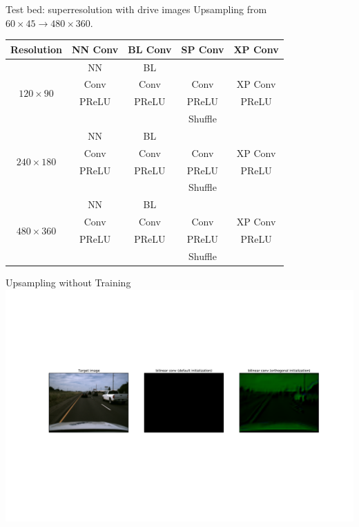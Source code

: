 \documentclass[]{beamer}
\begin{document}
\begin{frame}{Test bed: superresolution with drive images}
\centering
Upsampling from $60 \times 45 \rightarrow 480 \times 360$.
\begin{table}
\begin{tabular}{ccccc}
Resolution                           & NN Conv & BL Conv & SP Conv & XP Conv \\
\hline
\multirow{4}{*}{$120 \times 90$}     & NN      & BL      &         & \\
                                     & Conv    & Conv    & Conv    & XP Conv \\
                                     & PReLU   & PReLU   & PReLU   & PReLU \\
                                     &         &         & Shuffle & \\
\hline
\multirow{4}{*}{$240 \times 180$}    & NN      & BL      &         & \\
                                     & Conv    & Conv    & Conv    & XP Conv \\
                                     & PReLU   & PReLU   & PReLU   & PReLU \\
                                     &         &         & Shuffle & \\
\hline
\multirow{4}{*}{$480 \times 360$}    & NN      & BL      &         & \\
                                     & Conv    & Conv    & Conv    & XP Conv \\
                                     & PReLU   & PReLU   & PReLU   & PReLU \\
                                     &         &         & Shuffle & \\
\end{tabular}
\end{table}
\end{frame}


\begin{frame}{Upsampling without Training}
\includegraphics[width=1.0\textwidth, height=\textheight, trim={4cm 1cm 4cm 1cm},clip]{figures/bilinear-conv-initialization}
\end{frame}
\end{document}
